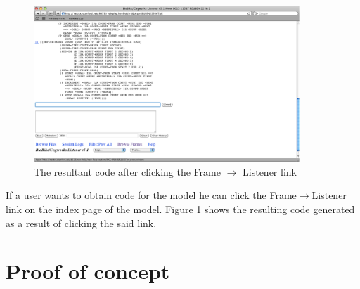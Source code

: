 \begin{figure}[h]
  \centering
  \includegraphics[width=100mm]{ConvertFrameToImage}
  \caption{The resultant code after clicking the Frame $\rightarrow$ Listener
    link}
  \label{ConvertFrameToImage}
\end{figure}

If a user wants to obtain code for the model he can click the
Frame$\rightarrow$Listener link on the index page of the model. Figure
\ref{ConvertFrameToImage} shows the resulting code generated as a
result of clicking the said link.


\section{Proof of concept}

